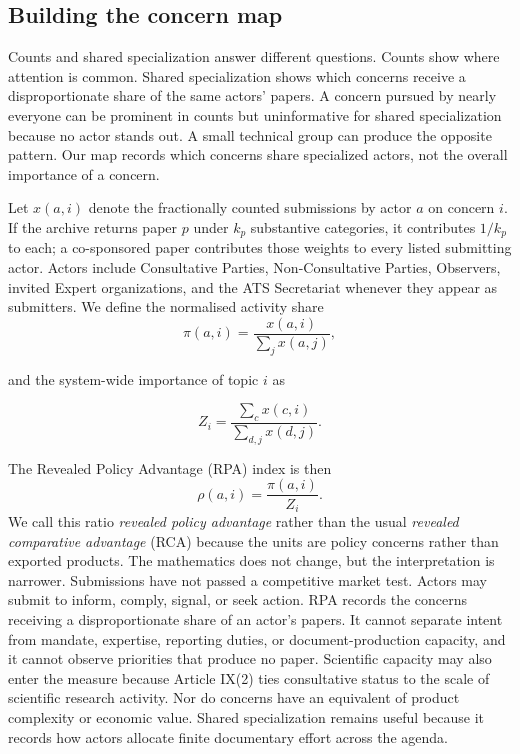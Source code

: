 \documentclass{fun_article}
\begin{document}
\subsection{Building the concern map}\label{sec:map-construction}
Counts and shared specialization answer different questions. Counts show where attention is common. Shared specialization shows which concerns receive a disproportionate share of the same actors' papers. A concern pursued by nearly everyone can be prominent in counts but uninformative for shared specialization because no actor stands out. A small technical group can produce the opposite pattern. Our map records which concerns share specialized actors, not the overall importance of a concern.

Let $x(a,i)$ denote the fractionally counted submissions by actor $a$ on concern $i$. If the archive returns paper $p$ under $k_p$ substantive categories, it contributes $1/k_p$ to each; a co-sponsored paper contributes those weights to every listed submitting actor. Actors include Consultative Parties, Non-Consultative Parties, Observers, invited Expert organizations, and the ATS Secretariat whenever they appear as submitters. We define the normalised activity share
\begin{equation}\label{eq:activity_share}
\pi(a,i) = \frac{x(a,i)}{\sum_j x(a,j)},
\end{equation}

and the system-wide importance of topic $i$ as

\begin{equation}\label{eq:topic_importance}
Z_i = \frac{\sum_c x(c,i)}{\sum_{d,j} x(d,j)}.
\end{equation}

The Revealed Policy Advantage (RPA) index is then
\begin{equation}\label{eq:rpa}
 \rho(a,i) = \frac{\pi(a,i)}{Z_i}.
\end{equation}
We call this ratio \emph{revealed policy advantage} rather than the usual \emph{revealed comparative advantage} (RCA) because the units are policy concerns rather than exported products. The mathematics does not change, but the interpretation is narrower. Submissions have not passed a competitive market test. Actors may submit to inform, comply, signal, or seek action. RPA records the concerns receiving a disproportionate share of an actor's papers. It cannot separate intent from mandate, expertise, reporting duties, or document-production capacity, and it cannot observe priorities that produce no paper. Scientific capacity may also enter the measure because Article IX(2) ties consultative status to the scale of scientific research activity. Nor do concerns have an equivalent of product complexity or economic value. Shared specialization remains useful because it records how actors allocate finite documentary effort across the agenda.
\end{document}
